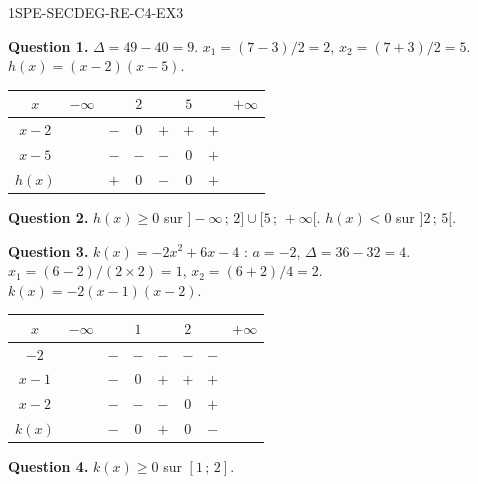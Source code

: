 \begin{corrige}{1SPE-SECDEG-RE-C4-EX3}

\textbf{Question 1.} $\Delta = 49 - 40 = 9$. $x_1 = (7-3)/2 = 2$, $x_2 = (7+3)/2 = 5$.
$h(x) = (x-2)(x-5)$.

\begin{center}
\begin{tabular}{|c|ccccccc|}
\hline
$x$ & $-\infty$ & & $2$ & & $5$ & & $+\infty$ \\
\hline
$x-2$ & & $-$ & $0$ & $+$ & $+$ & $+$ & \\
$x-5$ & & $-$ & $-$ & $-$ & $0$ & $+$ & \\
\hline
$h(x)$ & & $+$ & $0$ & $-$ & $0$ & $+$ & \\
\hline
\end{tabular}
\end{center}

\textbf{Question 2.} $h(x) \geq 0$ sur $]-\infty\,;\,2] \cup [5\,;\,+\infty[$. \quad $h(x) < 0$ sur $]2\,;\,5[$.

\textbf{Question 3.} $k(x) = -2x^2 + 6x - 4$ : $a = -2$, $\Delta = 36 - 32 = 4$.
$x_1 = (6-2)/(2 \times 2) = 1$, $x_2 = (6+2)/4 = 2$.
$k(x) = -2(x-1)(x-2)$.

\begin{center}
\begin{tabular}{|c|ccccccc|}
\hline
$x$ & $-\infty$ & & $1$ & & $2$ & & $+\infty$ \\
\hline
$-2$ & & $-$ & $-$ & $-$ & $-$ & $-$ & \\
$x-1$ & & $-$ & $0$ & $+$ & $+$ & $+$ & \\
$x-2$ & & $-$ & $-$ & $-$ & $0$ & $+$ & \\
\hline
$k(x)$ & & $-$ & $0$ & $+$ & $0$ & $-$ & \\
\hline
\end{tabular}
\end{center}

\textbf{Question 4.} $k(x) \geq 0$ sur $[1\,;\,2]$.

\end{corrige}
